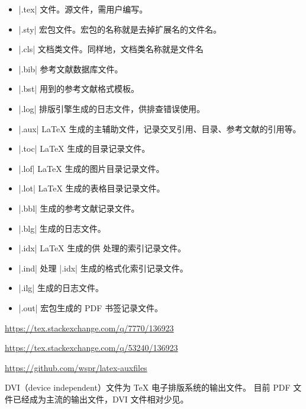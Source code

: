 \begin{itemize}
  \item |.tex| 文件。源文件，需用户编写。
  \item |.sty| 宏包文件。宏包的名称就是去掉扩展名的文件名。
  \item |.cls| 文档类文件。同样地，文档类名称就是文件名
  \item |.bib| \BibTeX{} 参考文献数据库文件。
  \item |.bst| \BibTeX{} 用到的参考文献格式模板。
  \item |.log| 排版引擎生成的日志文件，供排查错误使用。
  \item |.aux| \LaTeX{} 生成的主辅助文件，记录交叉引用、目录、参考文献的引用等。
  \item |.toc| \LaTeX{} 生成的目录记录文件。
  \item |.lof| \LaTeX{} 生成的图片目录记录文件。
  \item |.lot| \LaTeX{} 生成的表格目录记录文件。
  \item |.bbl| \BibTeX{} 生成的参考文献记录文件。
  \item |.blg| \BibTeX{} 生成的日志文件。
  \item |.idx| \LaTeX{} 生成的供  处理的索引记录文件。
  \item |.ind|  处理 |.idx| 生成的格式化索引记录文件。
  \item |.ilg|  生成的日志文件。
  \item |.out|  宏包生成的 PDF 书签记录文件。
\end{itemize}

\begin{reference}
  \item \url{https://tex.stackexchange.com/q/7770/136923}
  \item \url{https://tex.stackexchange.com/q/53240/136923}
  \item \url{https://github.com/wspr/latex-auxfiles}
\end{reference}



DVI（device independent）文件为 \TeX{} 电子排版系统的输出文件。
目前 PDF 文件已经成为主流的输出文件，DVI 文件相对少见。

